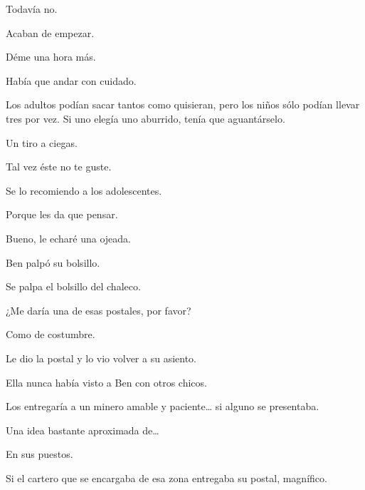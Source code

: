 \sk
Todavía no. 

\sk
Acaban de empezar. 

\sk
Déme una hora más.

\sk
Había que andar con cuidado. 

\sk
Los adultos podían
sacar tantos como quisieran, pero los niños sólo
podían llevar tres por vez. Si uno elegía uno
aburrido, tenía que aguantárselo.

\sk
Un tiro a ciegas. 

\sk
Tal vez éste no te guste. 

\sk
Se lo recomiendo a los adolescentes. 

\sk
Porque les da que pensar. 

\sk
Bueno, le echaré una ojeada. 

\sk
Ben palpó su bolsillo. 

\sk
Se palpa el bolsillo del chaleco. 

\sk
¿Me daría una de esas postales, por favor?

\sk
Como de costumbre. 

\sk
Le dio la postal y lo vio volver a su asiento. 

\sk
Ella nunca había visto a Ben con otros
chicos.

\sk
Los entregaría a un minero amable y paciente\ldots{} si
alguno se presentaba.

\sk
Una idea bastante aproximada de\ldots{}

\sk
En sus puestos. 

\sk
Si el cartero que se encargaba de esa
zona entregaba su postal, magnífico.

